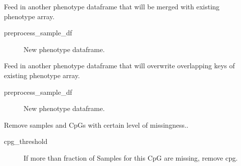 \documentclass[letterpaper,10pt,english]{sphinxmanual}
\begin{document}
\begin{fulllineitems}
\begin{fulllineitems}
\label{\detokenize{index:pymethylprocess.MethylationDataTypes.MethylationArray.merge_preprocess_sheet}}
Feed in another phenotype dataframe that will be merged with existing phenotype array.
\begin{description}
\item[{preprocess\_sample\_df}] \leavevmode
New phenotype dataframe.

\end{description}

\end{fulllineitems}


\begin{fulllineitems}
\label{\detokenize{index:pymethylprocess.MethylationDataTypes.MethylationArray.overwrite_pheno_data}}
Feed in another phenotype dataframe that will overwrite overlapping keys of existing phenotype array.
\begin{description}
\item[{preprocess\_sample\_df}] \leavevmode
New phenotype dataframe.

\end{description}

\end{fulllineitems}


\begin{fulllineitems}
\label{\detokenize{index:pymethylprocess.MethylationDataTypes.MethylationArray.remove_missingness}}
Remove samples and CpGs with certain level of missingness..
\begin{description}
\item[{cpg\_threshold}] \leavevmode
If more than fraction of Samples for this CpG are missing, remove cpg.


\end{description}
\end{fulllineitems}
\end{fulllineitems}
\end{document}
